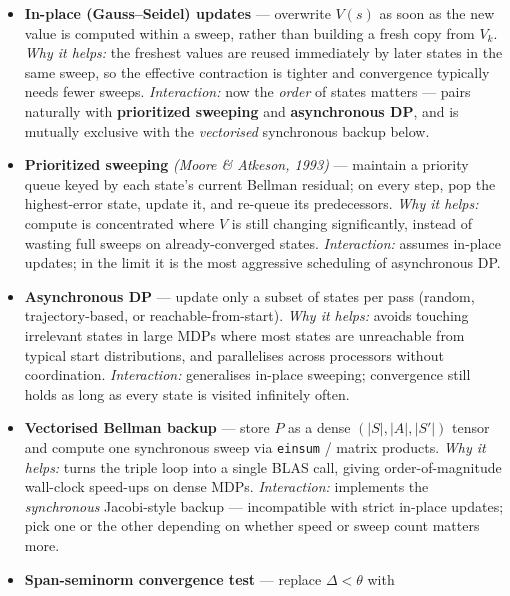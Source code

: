 \documentclass[11pt]{article}
\begin{document}
\begin{itemize}
\item
  \label{trick-1-1-1}\textbf{In-place (Gauss--Seidel)
  updates} --- overwrite \(V(s)\) as soon as the new value is computed
  within a sweep, rather than building a fresh copy from \(V_k\).
  \emph{Why it helps:} the freshest values are reused immediately by
  later states in the same sweep, so the effective contraction is
  tighter and convergence typically needs fewer sweeps.
  \emph{Interaction:} now the \emph{order} of states matters --- pairs
  naturally with \textbf{prioritized sweeping} and \textbf{asynchronous
  DP}, and is mutually exclusive with the \emph{vectorised} synchronous
  backup below.
\item
  \label{trick-1-1-2}\textbf{Prioritized sweeping}
  \emph{(Moore \& Atkeson, 1993)} --- maintain a priority queue keyed by
  each state's current Bellman residual; on every step, pop the
  highest-error state, update it, and re-queue its predecessors.
  \emph{Why it helps:} compute is concentrated where \(V\) is still
  changing significantly, instead of wasting full sweeps on
  already-converged states. \emph{Interaction:} assumes in-place
  updates; in the limit it is the most aggressive scheduling of
  asynchronous DP.
\item
  \label{trick-1-1-3}\textbf{Asynchronous DP} --- update
  only a subset of states per pass (random, trajectory-based, or
  reachable-from-start). \emph{Why it helps:} avoids touching irrelevant
  states in large MDPs where most states are unreachable from typical
  start distributions, and parallelises across processors without
  coordination. \emph{Interaction:} generalises in-place sweeping;
  convergence still holds as long as every state is visited infinitely
  often.
\item
  \label{trick-1-1-4}\textbf{Vectorised Bellman backup}
  --- store \(P\) as a dense \((|S|,|A|,|S'|)\) tensor and compute one
  synchronous sweep via \texttt{einsum} / matrix products. \emph{Why it
  helps:} turns the triple loop into a single BLAS call, giving
  order-of-magnitude wall-clock speed-ups on dense MDPs.
  \emph{Interaction:} implements the \emph{synchronous} Jacobi-style
  backup --- incompatible with strict in-place updates; pick one or the
  other depending on whether speed or sweep count matters more.
\item
  \label{trick-1-1-5}\textbf{Span-seminorm convergence
  test} --- replace \(\Delta < \theta\) with

\end{itemize}
\end{document}
